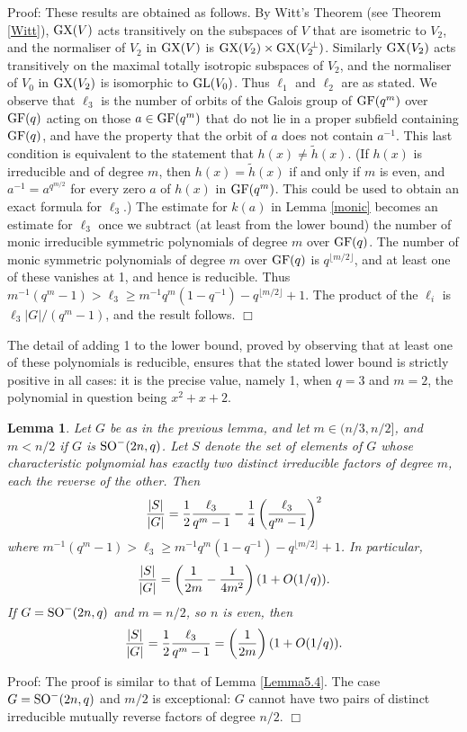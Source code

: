 \documentclass[12pt]{article}
\newtheorem{lemma}[definition]{Lemma}
\newenvironment{proof}{\normalsize {\sc Proof}:}{{\hfill $\Box$ \\}}
\def\SO{{\rm SO}}
\def\GL{{\rm GL}}
\def\Oh{O}  %
\def\GF{{\rm GF}}
\def\GX{{\rm GX}}
\begin{document}
\begin{proof}
These results are obtained as follows. By Witt's Theorem 
(see Theorem \ref{Witt}), $\GX(V)$ acts transitively
on the subspaces of $V$ that are isometric to $V_2$, and the normaliser of
$V_2$ in $\GX(V)$ is $\GX(V_2)\times \GX(V_2^\perp)$.  
Similarly $\GX(V_2)$ acts
transitively on the maximal totally isotropic subspaces of $V_2$, and the
normaliser of $V_0$ in $\GX(V_2)$ is isomorphic to $\GL(V_0)$.  Thus $\ell_1$
and $\ell_2$ are as stated.
We observe that $\ell_3$ is the number of orbits of the Galois group of
$\GF(q^m)$ over $\GF(q)$ acting on those $a \in \GF(q^m)$ that 
do not lie
in a proper subfield containing $\GF(q)$, and have the property that 
the orbit of $a$ does not contain $a^{-1}$.  This last condition is 
equivalent to the statement that $h(x)\ne \tilde{h}(x)$.   
(If $h(x)$ is irreducible and of degree $m$,
then $h(x)=\tilde{h}(x)$ if and only if
$m$ is even, and $a^{-1}=a^{q^{m/2}}$
for every zero $a$ of $h(x)$ in $\GF(q^m)$. This could
be used to obtain an exact formula for $\ell_3$.)
The estimate for $k(a)$ in Lemma \ref{monic} becomes an estimate for $\ell_3$
once we subtract (at least from the lower bound) the 
number of monic irreducible
symmetric polynomials of degree $m$ over $\GF(q)$.  
The number of monic symmetric
polynomials of degree $m$ over $\GF(q)$ is $q^{\lfloor m/2\rfloor}$,
and at least one of these vanishes at 1, and hence is reducible.
Thus $m^{-1}(q^m-1)>\ell_3\ge m^{-1}q^m(1-q^{-1})-q^{\lfloor m/2\rfloor}+1$.
The product of the $\ell_i$ is
$\ell_3\vert G\vert/(q^m-1)$, and the result follows. 
\end{proof}

The detail of adding 1 to the lower bound, proved 
by observing that at least
one of these polynomials is reducible, ensures that the 
stated lower bound is strictly positive in all cases: it
is the precise value, namely 1, 
when $q=3$ and $m=2$, the polynomial in question being $x^2+x+2$.

\begin{lemma}\label{Lemma5.9} 
Let $G$ be as in the previous lemma, and let $m\in(n/3,n/2]$, and $m<n/2$
if $G$ is $\SO^-(2n,q)$. 
Let $S$ denote the set of elements of $G$ whose characteristic polynomial
has exactly two distinct irreducible factors of degree $m$, each the 
reverse of the other.
Then 
$${\vert S\vert\over\vert G\vert}=
{1\over2}{\ell_3\over q^m-1} - {1\over4}\left({\ell_3\over q^m-1}\right)^2$$
where $m^{-1}(q^m-1)>\ell_3\ge m^{-1}q^m(1-q^{-1})-q^{\lfloor m/2\rfloor}+1$.
In particular,
$${\vert S\vert\over\vert G\vert}=
\left({1\over2m}-{1\over4m^2}\right)(1+\Oh(1/q)).$$
If $G=\SO^-(2n,q)$ and $m = n/2$, so $n$ is even, then 
$${\vert S\vert\over\vert G\vert}=
{1\over2}{\ell_3\over q^m-1} = 
\left({1\over2m}\right)(1+\Oh(1/q)).$$
\end{lemma}
\begin{proof} 
The proof is similar to that of Lemma \ref{Lemma5.4}.  
The case $G=\SO^-(2n,q)$
and $m/2$ is exceptional: $G$ cannot have two 
pairs of distinct irreducible
mutually reverse factors of degree $n/2$.
\end{proof}
\end{document}
